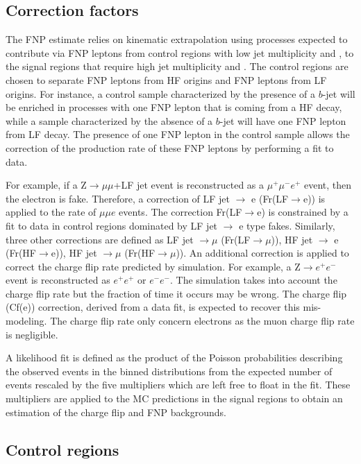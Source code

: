 \subsection{Correction factors}

The FNP estimate relies on kinematic extrapolation using processes expected to contribute via FNP leptons from control regions 
with low jet multiplicity and \met, to the signal regions that require high jet multiplicity and \met. 
The control regions are chosen to separate FNP leptons from HF origins and FNP leptons from LF origins.
For instance, a control sample characterized by the presence of a $b$-jet will be enriched in processes with one FNP lepton that is 
coming from a HF decay, while a sample characterized by the absence of a $b$-jet will have one FNP lepton from LF decay.
The presence of one FNP lepton in the control sample allows the correction of the production rate of these FNP leptons 
by performing a fit to data. 

For example, if a Z$\to\mu\mu$+LF jet event is reconstructed as a $\mu^+\mu^-e^+$ event, then the electron is fake.
Therefore, a correction of LF jet $\to$ e (Fr(LF$\to$e)) is applied to the rate of $\mu\mu e$ events. The correction Fr(LF$\to$e)
is constrained by a fit to data in control regions dominated by LF jet $\to$ e type fakes. 
Similarly, three other corrections are defined as LF jet $\to\mu$ (Fr(LF$\to\mu$)),  HF jet $\to$ e (Fr(HF$\to$e)),  
HF jet $\to\mu$ (Fr(HF$\to\mu$)). An additional correction is applied to correct the charge flip rate predicted by simulation.
For example, a Z$\to e^+e^-$ event is reconstructed as $e^+e^+$ or $e^-e^-$. The simulation takes into account the charge flip 
rate but the fraction of time it occurs may be wrong. The charge flip (Cf(e)) correction, derived from a data fit, is expected to recover this mis-modeling.
The charge flip rate only concern electrons as the muon charge flip rate is negligible.

A likelihood fit is defined as the product of the Poisson probabilities describing the observed events in the binned 
distributions from the expected number of events rescaled by the five multipliers which are left free to float in the fit.  
These multipliers are applied to the MC predictions in the signal regions to obtain an estimation of the charge flip and FNP backgrounds.

\subsection{Control regions}

